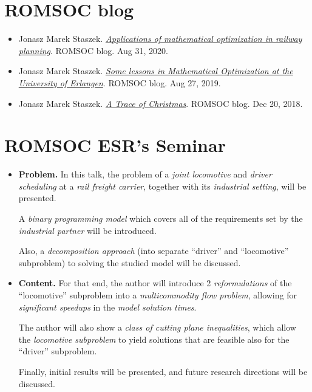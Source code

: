 \documentclass{book}
\numberwithin{equation}{section}
\begin{document}
\section{ROMSOC blog}
\begin{itemize}
    \item Jonasz Marek Staszek. \href{https://www.romsoc.eu/applications-of-mathematical-optimization-in-railway-planning/}{\textit{Applications of mathematical optimization in railway planning}}. ROMSOC blog. Aug 31, 2020.
    \item Jonasz Marek Staszek. \href{https://www.romsoc.eu/some-lessons-in-mathematical-optimization-at-the-university-of-erlangen/}{\textit{Some lessons in Mathematical Optimization at the University of Erlangen}}. ROMSOC blog. Aug 27, 2019.
    \item Jonasz Marek Staszek. \href{https://www.romsoc.eu/a-trace-of-christmas/}{\textit{A Trace of Christmas}}. ROMSOC blog. Dec 20, 2018.
\end{itemize}

\section{ROMSOC ESR's Seminar}
\begin{itemize}
    \item \textbf{Problem.} In this talk, the problem of a \textit{joint locomotive} and \textit{driver scheduling} at a \textit{rail freight carrier}, together with its \textit{industrial setting}, will be presented.
    
    A \textit{binary programming model} which covers all of the requirements set by the \textit{industrial partner} will be introduced.
    
    Also, a \textit{decomposition approach} (into separate ``driver'' and ``locomotive'' subproblem) to solving the studied model will be discussed.
    \item \textbf{Content.} For that end, the author will introduce 2 \textit{reformulations} of the ``locomotive'' subproblem into a \textit{multicommodity flow problem}, allowing for \textit{significant speedups} in the \textit{model solution times}.
    
    The author will also show a \textit{class of cutting plane inequalities}, which allow the \textit{locomotive subproblem} to yield solutions that are feasible also for the ``driver'' subproblem.
    
    Finally, initial results will be presented, and future research directions will be discussed.
\end{itemize}
\end{document}
